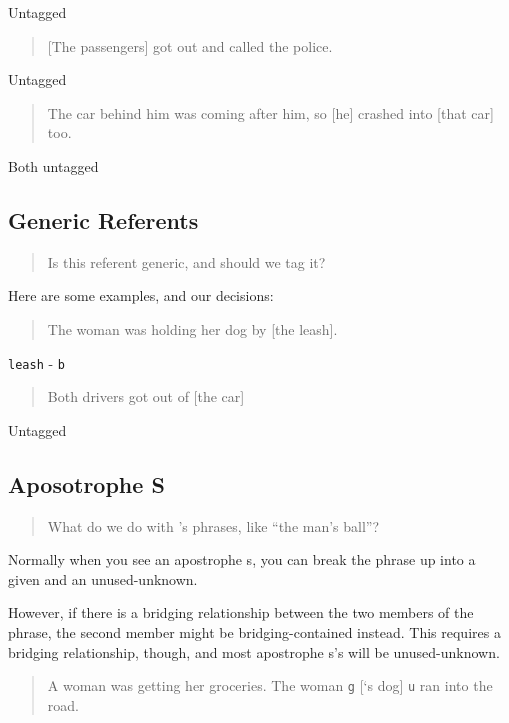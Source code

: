 \documentclass[
]{book}
\begin{document}
Untagged

\begin{quote}
{[}The passengers{]} got out and called the police.
\end{quote}

Untagged

\begin{quote}
The car behind him was coming after him, so {[}he{]} crashed into {[}that car{]} too.
\end{quote}

Both untagged

\hypertarget{generic-referents}{%
\subsection{Generic Referents}\label{generic-referents}}

\begin{quote}
Is this referent generic, and should we tag it?
\end{quote}

Here are some examples, and our decisions:

\begin{quote}
The woman was holding her dog by {[}the leash{]}.
\end{quote}

\texttt{leash} - \texttt{b}

\begin{quote}
Both drivers got out of {[}the car{]}
\end{quote}

Untagged

\hypertarget{aposotrophe-s}{%
\subsection{Aposotrophe S}\label{aposotrophe-s}}

\begin{quote}
What do we do with 's phrases, like ``the man's ball''?
\end{quote}

Normally when you see an apostrophe s, you can break the phrase up into a given and an unused-unknown.

However, if there is a bridging relationship between the two members of the phrase, the second member might be bridging-contained instead.
This requires a bridging relationship, though, and most apostrophe s's will be unused-unknown.

\begin{quote}
A woman was getting her groceries.
The woman \texttt{g} {[}`s dog{]} \texttt{u} ran into the road.
\end{quote}
\end{document}
